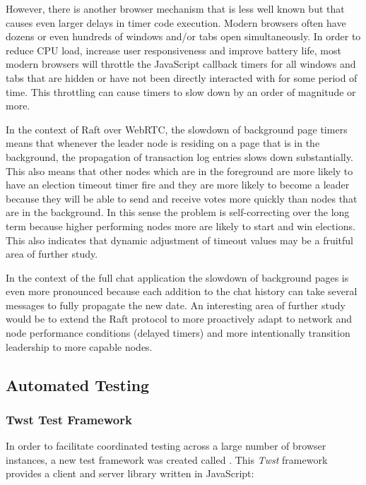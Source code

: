 \documentclass[conference,compsoc]{./IEEEtran/IEEEtran}
\begin{document}
However, there is another browser mechanism that is less well known
but that causes even larger delays in timer code execution. Modern
browsers often have dozens or even hundreds of windows and/or tabs
open simultaneously. In order to reduce CPU load, increase user
responsiveness and improve battery life, most modern browsers will
throttle the JavaScript callback timers for all windows and tabs that
are hidden or have not been directly interacted with for some period
of time. This throttling can cause timers to slow down by an order of
magnitude or more. %

In the context of Raft over WebRTC, the slowdown of background page
timers means that whenever the leader node is residing on a page that
is in the background, the propagation of transaction log entries slows
down substantially. This also means that other nodes which are in the
foreground are more likely to have an election timeout timer fire and
they are more likely to become a leader because they will be able to
send and receive votes more quickly than nodes that are in the
background.  In this sense the problem is self-correcting over
the long term because higher performing nodes more are likely to start
and win elections. This also indicates that dynamic adjustment of timeout
values may be a fruitful area of further study.

In the context of the full chat application the slowdown of background
pages is even more pronounced because each addition to the chat
history can take several messages to fully propagate the new date. An
interesting area of further study would be to extend the Raft protocol
to more proactively adapt to network and node performance conditions
(delayed timers) and more intentionally transition leadership to more
capable nodes.

\fi  %


\subsection{Automated Testing}

\subsubsection{Twst Test Framework}

In order to facilitate coordinated testing across a large number of
browser instances, a new test framework was created called
\cite{twst}. This \emph{Twst} framework provides a client and server
library written in JavaScript:
\end{document}

